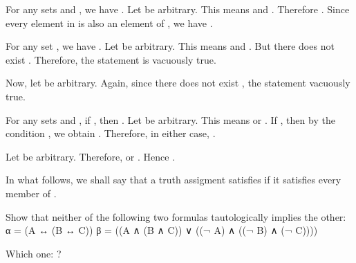 \startexercises [title={\getvariable{document}{author}  \hfill  \getvariable{document}{course}  \hfill  2019-09-10}]
	
	\startproposition [title={Exercise 1.8}]
		For any sets  and , we have .
	\stopproposition
	\startproof
		Let  be arbitrary. This means  and . Therefore . Since every element in  is also an element of , we have .
	\stopproof

	\startproposition [title={Exercise 1.10}]
		For any set , we have .
	\stopproposition
	\startproof
		Let  be arbitrary. This means  and . But there does not exist . Therefore, the statement is vacuously true.

		Now, let  be arbitrary. Again, since there does not exist , the statement vacuously true.
	\stopproof

	\startproposition [title={Exercise 1.13}]
		For any sets  and , if , then .
	\stopproposition
	\startproof
		Let  be arbitrary. This means  or . If , then by the condition , we obtain . Therefore, in either case, .

		Let  be arbitrary. Therefore,  or . Hence .
	\stopproof

\stopexercises


\startexercises [title={\getvariable{document}{author}  \hfill  \getvariable{document}{course}  \hfill  2019-09-24}]

	In what follows, we shall say that a truth assigment  satisfies  if it satisfies every member of .
	
	\startproposition [title={Exercise 1.2.1}]
		Show that neither of the following two formulas tautologically implies the other:
		\startformula  \startalign[align={right, left}]
			\NC  α =  \NC  (A ↔ (B ↔ C))  \NR
			\NC  β =  \NC  ((A ∧ (B ∧ C)) ∨ ((¬ A) ∧ ((¬ B) ∧ (¬ C))))  \NR
		\stopalign  \stopformula

	\stopproposition
	\startproof
		Which one: ?

